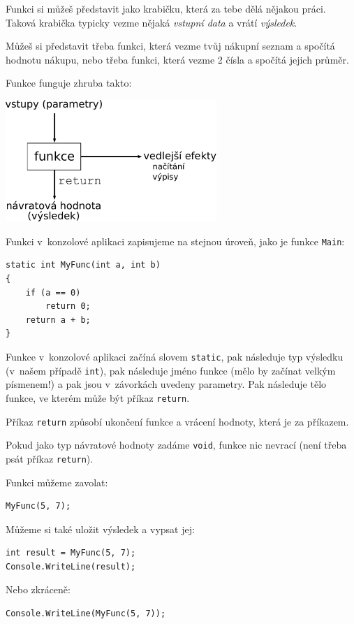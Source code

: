 \documentclass[12pt,a4paper]{article}
\begin{document}
Funkci si můžeš představit jako krabičku, která za tebe dělá nějakou práci.
Taková krabička typicky vezme nějaká \textit{vstupní data} a vrátí
\textit{výsledek}.

Můžeš si představit třeba funkci, která vezme tvůj nákupní seznam a spočítá
hodnotu nákupu, nebo třeba funkci, která vezme 2 čísla a spočítá jejich
průměr.

Funkce funguje zhruba takto:

\vspace{5mm}
\includegraphics[width=8cm]{diagram.pdf}
\vspace{5mm}

Funkci v~konzolové aplikaci zapisujeme na stejnou úroveň, jako je funkce
\texttt{Main}:
\begin{verbatim}
static int MyFunc(int a, int b)
{
    if (a == 0)
        return 0;
    return a + b;
}
\end{verbatim}

Funkce v~konzolové aplikaci začíná slovem \texttt{static}, pak následuje typ
výsledku (v~našem případě \texttt{int}), pak následuje jméno funkce (mělo by
začínat velkým písmenem!) a pak jsou v~závorkách uvedeny parametry. Pak
následuje tělo funkce, ve kterém může být příkaz \texttt{return}.

Příkaz \texttt{return} způsobí ukončení funkce a vrácení hodnoty, která
je za příkazem.

Pokud jako typ návratové hodnoty zadáme \texttt{void}, funkce nic nevrací
(není třeba psát příkaz \texttt{return}).

Funkci můžeme zavolat:
\begin{verbatim}
MyFunc(5, 7);
\end{verbatim}

Můžeme si také uložit výsledek a vypsat jej:
\begin{verbatim}
int result = MyFunc(5, 7);
Console.WriteLine(result);
\end{verbatim}

Nebo zkráceně:
\begin{verbatim}
Console.WriteLine(MyFunc(5, 7));
\end{verbatim}
\end{document}
